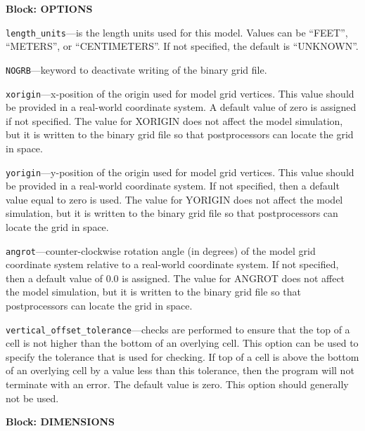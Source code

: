 
\item \textbf{Block: OPTIONS}

\begin{description}
\item \texttt{length\_units}---is the length units used for this model.  Values can be ``FEET'', ``METERS'', or ``CENTIMETERS''.  If not specified, the default is ``UNKNOWN''.

\item \texttt{NOGRB}---keyword to deactivate writing of the binary grid file.

\item \texttt{xorigin}---x-position of the origin used for model grid vertices.  This value should be provided in a real-world coordinate system.  A default value of zero is assigned if not specified.  The value for XORIGIN does not affect the model simulation, but it is written to the binary grid file so that postprocessors can locate the grid in space.

\item \texttt{yorigin}---y-position of the origin used for model grid vertices.  This value should be provided in a real-world coordinate system.  If not specified, then a default value equal to zero is used.  The value for YORIGIN does not affect the model simulation, but it is written to the binary grid file so that postprocessors can locate the grid in space.

\item \texttt{angrot}---counter-clockwise rotation angle (in degrees) of the model grid coordinate system relative to a real-world coordinate system.  If not specified, then a default value of 0.0 is assigned.  The value for ANGROT does not affect the model simulation, but it is written to the binary grid file so that postprocessors can locate the grid in space.

\item \texttt{vertical\_offset\_tolerance}---checks are performed to ensure that the top of a cell is not higher than the bottom of an overlying cell.  This option can be used to specify the tolerance that is used for checking.  If top of a cell is above the bottom of an overlying cell by a value less than this tolerance, then the program will not terminate with an error.  The default value is zero.  This option should generally not be used.

\end{description}
\item \textbf{Block: DIMENSIONS}

